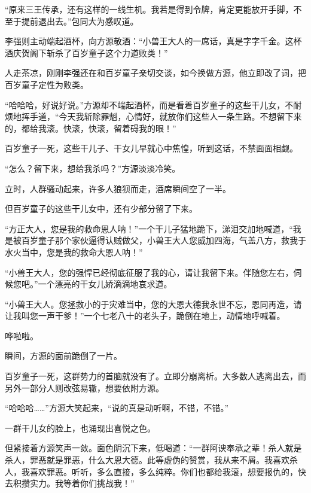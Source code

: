 
\begin{this_body}



“原来三王传承，还有这样的一线生机。我若是得到令牌，肯定更能放开手脚，不至于提前退出去。”包同大为感叹道。

李强则主动端起酒杯，向方源敬酒：“小兽王大人的一席话，真是字字千金。这杯酒庆贺阁下斩杀了百岁童子这个力道败类！”

人走茶凉，刚刚李强还在和百岁童子亲切交谈，如今换做方源，他立即改了词，把百岁童子定性为败类。

“哈哈哈，好说好说。”方源却不端起酒杯，而是看着百岁童子的这些干儿女，不耐烦地挥手道，“今天我斩除罪魁，心情好，就放你们这些人一条生路。不想留下来的，都给我滚。快滚，快滚，留着碍我的眼！”

百岁童子一死，这些干儿子、干女儿早就心中焦惶，听到这话，不禁面面相觑。

“怎么？留下来，想给我杀吗？”方源淡淡冷笑。

立时，人群骚动起来，许多人狼狈而走，酒席瞬间空了一半。

但百岁童子的这些干儿女中，还有少部分留了下来。

“方正大人，您是我的救命恩人呐！”一个干儿子猛地跪下，涕泪交加地喊道，“我是被百岁童子那个家伙逼得认贼做父，小兽王大人您威加四海，气盖八方，救我于水火当中，您是我的救命大恩人呐！”

“小兽王大人，您的强悍已经彻底征服了我的心，请让我留下来。伴随您左右，伺候您吧。”一个漂亮的干女儿娇滴滴地哀求道。

“小兽王大人。您拯救小的于灾难当中，您的大恩大德我永世不忘，恩同再造，请让我叫您一声干爹！”一个七老八十的老头子，跪倒在地上，动情地呼喊着。

哗啦啦。

瞬间，方源的面前跪倒了一片。

百岁童子一死，这群势力的首脑就没有了。立即分崩离析。大多数人逃离出去，而另外一部分人则改弦易辙，想要依附方源。

“哈哈哈……”方源大笑起来，“说的真是动听啊，不错，不错。”

一群干儿女的脸上，也涌现出喜悦之色。

但紧接着方源笑声一敛。面色阴沉下来，低喝道：“一群阿谀奉承之辈！杀人就是杀人，罪恶就是罪恶，什么大恩大德。此等虚伪的赞赏，我从来不屑。我喜欢杀人，我喜欢罪恶。听听，多么直接，多么纯粹。你们也都给我滚，想要报仇的，快去积攒实力。我等着你们挑战我！”


\end{this_body}
